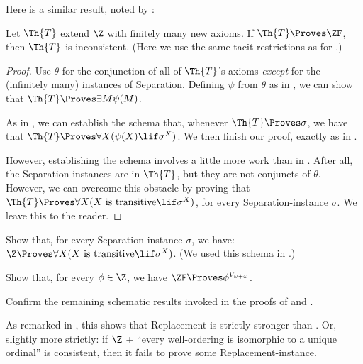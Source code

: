 \documentclass[../../../include/open-logic-section]{subfiles}
\begin{document}
Here is a similar result, noted by \cite[223]{Potter2004}:

\begin{prop}
	Let $\Th{T}$ extend $\Z$ with finitely many new axioms. If $\Th{T} \Proves \ZF$, then $\Th{T}$ is inconsistent. (Here we use the same tacit restrictions as for .)
\end{prop}
\begin{proof}
	Use $\theta$ for the conjunction of all of $\Th{T}$'s axioms \emph{except} for the (infinitely many) instances of Separation. Defining $\psi$ from $\theta$ as in , we can show that $\Th{T} \Proves \exists M \psi(M)$. 
	
	As in , we can establish the schema that, whenever $\Th{T} \Proves \sigma$, we have that $\Th{T} \Proves \forall X(\psi(X) \lif \sigma^X)$. We then finish our proof, exactly as in .
	
	However, establishing the schema involves a little more work than in . After all, the Separation-instances are in $\Th{T}$, but they are not conjuncts of $\theta$. However, we can overcome this obstacle by proving that $\Th{T} \Proves \forall X(X\text{ is transitive} \lif \sigma^X)$, for every Separation-instance $\sigma$. We leave this to the reader. 
\end{proof}
\begin{prob}
	Show that, for every Separation-instance $\sigma$, we have: $\Z \Proves \forall X(X\text{ is transitive} \lif \sigma^X)$. (We used this schema in .)
\end{prob}
\begin{prob}
	Show that, for every $\phi \in \Z$, we have $\ZF \Proves \phi^{V_{\omega+\omega}}$.
\end{prob}
\begin{prob}
	Confirm the remaining schematic results invoked in the proofs of  and  .
\end{prob}

As remarked in , this shows that Replacement is strictly stronger than
. Or, slightly more strictly: if $\Z$ + ``every well-ordering is isomorphic to a unique ordinal'' is consistent, then it fails to prove some Replacement-instance.


\end{document}
